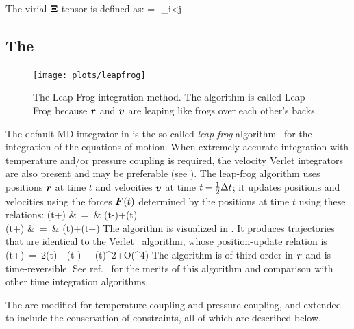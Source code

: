 The virial ${\bf \Xi}$ tensor is defined as:
\beq
{\bf \Xi} = -\half \sum_{i<j} \rvij \otimes \Fvij 
\label{eqn:Xi}
\eeq



\subsection{The }
\label{subsec:update}
\begin{figure}
\centerline{\texttt{[image: plots/leapfrog]}}
\caption[The Leap-Frog integration method.]{The Leap-Frog integration method. The algorithm is called Leap-Frog because $\mbox{\boldmath ${r}$}$ and $\mbox{\boldmath ${v}$}$ are leaping
like  frogs over each other's backs.}
\label{fig:leapfrog}
\end{figure}

The default MD integrator in {\gromacs} is the so-called {\em leap-frog} 
algorithm~\cite{Hockney74} for the integration of the equations of
motion.  When extremely accurate integration with temperature
and/or pressure coupling is required, the velocity Verlet integrators
are also present and may be preferable (see ). The leap-frog
algorithm uses positions $\mbox{\boldmath ${r}$}$ at time $t$ and
velocities $\mbox{\boldmath ${v}$}$ at time $t-\frac{1}{2} {\Delta t}$; it updates positions and
velocities using the forces
$\mbox{\boldmath ${F}$}(t)$ determined by the positions at time $t$ using these relations:
\bea
\label{eqn:leapfrogv}
(t+\hDt)  &~=~&   (t-\hDt)+(t)   \\
(t+\Dt)   &~=~&   (t)+\Dt{}(t+\hDt)
\eea
The algorithm is visualized in .
It produces trajectories that are identical to the Verlet~\cite{Verlet67} algorithm,
whose position-update relation is
\beq
{}(t+\Dt)~=~2(t) - (t-\Dt) + (t)\Dt^2+O(\Dt^4)
\eeq
The algorithm is of third order in $\mbox{\boldmath ${r}$}$ and is time-reversible.
See ref.~\cite{Berendsen86b} for the merits of this algorithm and comparison
with other time integration algorithms.

The  are modified for temperature
coupling and pressure coupling, and extended to include the
conservation of constraints, all of which are described below.  


